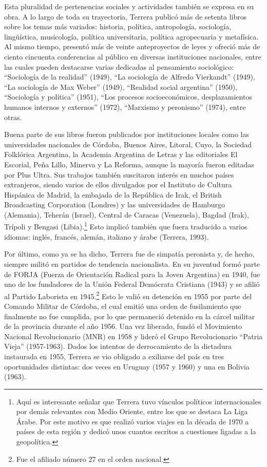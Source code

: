 Esta pluralidad de pertenencias sociales y actividades también se expresa en su obra. A lo largo de toda su trayectoria, Terrera publicó más de setenta libros sobre los temas más variados: historia, política, antropología, sociología, lingüística, musicología, política universitaria, política agropecuaria y metafísica. Al mismo tiempo, presentó más de veinte anteproyectos de leyes y ofreció más de ciento cincuenta conferencias al público en diversas instituciones nacionales, entre las cuales pueden destacarse varias dedicadas al pensamiento sociológico: ``Sociología de la realidad'' (1949), ``La sociología de Alfredo Vierkandt'' (1949), ``La sociología de Max Weber'' (1949), ``Realidad social argentina'' (1950), ``Sociología y política'' (1951), ``Los procesos socioeconómicos, desplazamientos humanos internos y externos'' (1972), ``Marxismo y peronismo'' (1974), entre otras.

Buena parte de sus libros fueron publicados por instituciones locales como las universidades nacionales de Córdoba, Buenos Aires, Litoral, Cuyo, la Sociedad Folklórica Argentina, la Academia Argentina de Letras y las editoriales El Escorial, Peña Lillo, Minerva y La Reforma, aunque la mayoría fueron editadas por Plus Ultra. Sus trabajos también suscitaron interés en muchos países extranjeros, siendo varios de ellos divulgados por el Instituto de Cultura Hispánica de Madrid, la embajada de la República de Irak, el British Broadcasting Corporation (Londres) y las universidades de Hamburgo (Alemania), Teherán (Israel), Central de Caracas (Venezuela), Bagdad (Irak), Trípoli y Bengasi (Libia).\footnote{Aquí es interesante señalar que Terrera tuvo vínculos políticos internacionales por demás relevantes con Medio Oriente, entre los que se destaca La Liga Árabe. Por este motivo es que realizó varios viajes en la década de 1970 a países de esta región y dedicó unos cuantos escritos a cuestiones ligadas a la geopolítica.} Esto implicó también que fuera traducido a varios idiomas: inglés, francés, alemán, italiano y árabe (Terrera, 1993).

Por último, como ya se ha dicho, Terrera fue de simpatía peronista y, de hecho, siempre militó en partidos de tendencia nacionalista. En su juventud formó parte de FORJA (Fuerza de Orientación Radical para la Joven Argentina) en 1940, fue uno de los fundadores de la Unión Federal Demócrata Cristiana (1943) y se afilió al Partido Laborista en 1945.\footnote{Fue el afiliado número 27 en el orden nacional.} Esto le valió su detención en 1955 por parte del Comando Militar de Córdoba, el cual emitió una orden de fusilamiento que finalmente no fue cumplida, por lo que permaneció detenido en la cárcel militar de la provincia durante el año 1956. Una vez liberado, fundó el Movimiento Nacional Revolucionario (MNR) en 1958 y lideró el Grupo Revolucionario ``Patria Vieja'' (1957-1963). Dados los intentos de derrocamiento de la dictadura instaurada en 1955, Terrera se vio obligado a exiliarse del país en tres oportunidades distintas: dos veces en Uruguay (1957 y 1960) y una en Bolivia (1963).


